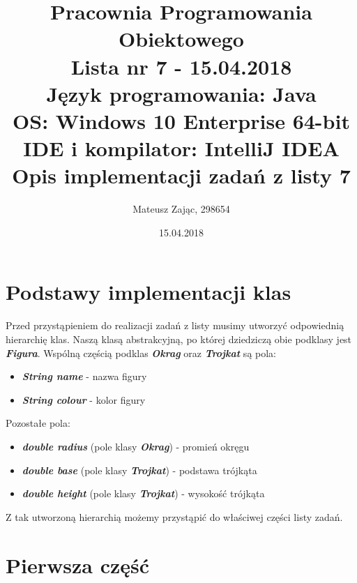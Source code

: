 \documentclass[12pt]{article}
\begin{document}
\title{
\textbf{Pracownia Programowania Obiektowego\\}
\textbf{Lista nr 7 - 15.04.2018\\}
\textbf{Język programowania:} Java\\
\textbf{OS:} Windows 10 Enterprise 64-bit\\
\textbf{IDE i kompilator:} IntelliJ IDEA\\
Opis implementacji zadań z listy 7
}

\author {Mateusz Zając, 298654}

\date {15.04.2018} 

\maketitle

\newpage

\section{Podstawy implementacji klas}

Przed przystąpieniem do realizacji zadań z listy musimy utworzyć odpowiednią hierarchię klas.
Naszą klasą abstrakcyjną, po której dziedziczą obie podklasy jest \textbf{\textit{Figura}}.
Wspólną częścią podklas \textbf{\textit{Okrag}} oraz \textbf{\textit{Trojkat}} są pola:
\begin{itemize}
\item \textbf{\textit{String name}} - nazwa figury
\item \textit{\textbf{String colour}} - kolor figury
\end{itemize}
Pozostałe pola:
\begin{itemize}
\item \textbf{\textit{double radius}} (pole klasy \textbf{\textit{Okrag}}) - promień okręgu
\item \textbf{\textit{double base}} (pole klasy \textbf{\textit{Trojkat}}) - podstawa trójkąta
\item \textbf{\textit{double height}} (pole klasy \textbf{\textit{Trojkat}}) - wysokość trójkąta
\end{itemize}

Z tak utworzoną hierarchią możemy przystąpić do właściwej części listy zadań.

\section{Pierwsza część}
\end{document}
